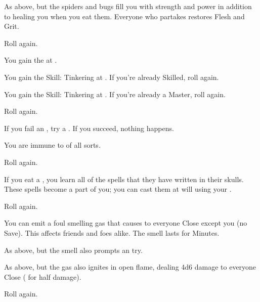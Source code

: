 \begin{multicols*}{2}
 As above, but the spiders and bugs fill you with strength and power in addition to healing you when you eat them.  Everyone who partakes restores \MAX Flesh and \MAX Grit.

 Roll again.



 
\NC[Name=Crafty]

 You gain the  at .

 You gain the Skill: Tinkering at .  If you're already Skilled, roll again.

 You gain the Skill: Tinkering at .  If you're already a Master, roll again.

 Roll again.

\NC[Name=Crazy]

  If you fail an , try a .  If you succeed, nothing happens.

  You are immune to  of all sorts.

  Roll again.


\NC[Name=Eat Brains]

  If you eat a , you learn all of the spells that they have written in their skulls.  These spells become a part of you; you can cast them at will using your \TAL.

  Roll again.

\newpage

\NC[Name=Gassy]

 You can emit a foul smelling gas that causes  to everyone Close except you (no Save). This affects friends and foes alike. The smell lasts for Minutes.

 As above, but the smell also prompts an  try.

 As above, but the gas also ignites in open flame, dealing 4d6 damage to everyone Close ( for half damage).

 Roll again.

\NC[Name=Go Night Night]


\end{multicols*}
